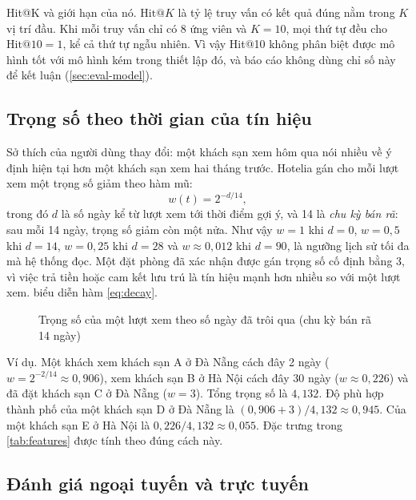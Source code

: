 Hit@K và giới hạn của nó. $\text{Hit@}K$ là tỷ lệ truy vấn có kết quả đúng nằm trong $K$ vị trí đầu. Khi mỗi truy vấn chỉ có 8 ứng viên và $K = 10$, mọi thứ tự đều cho $\text{Hit@10} = 1$, kể cả thứ tự ngẫu nhiên. Vì vậy Hit@10 không phân biệt được mô hình tốt với mô hình kém trong thiết lập đó, và báo cáo không dùng chỉ số này để kết luận (\cref{sec:eval-model}).

\subsection{Trọng số theo thời gian của tín hiệu}\label{sec:decay}

Sở thích của người dùng thay đổi: một khách sạn xem hôm qua nói nhiều về ý định hiện tại hơn một khách sạn xem hai tháng trước. Hotelia gán cho mỗi lượt xem một trọng số giảm theo hàm mũ:
\begin{equation}
  w(t) = 2^{-d/14},
  \label{eq:decay}
\end{equation}
trong đó $d$ là số ngày kể từ lượt xem tới thời điểm gợi ý, và 14 là \emph{chu kỳ bán rã}: sau mỗi 14 ngày, trọng số giảm còn một nửa. Như vậy $w = 1$ khi $d = 0$, $w = 0{,}5$ khi $d = 14$, $w = 0{,}25$ khi $d = 28$ và $w \approx 0{,}012$ khi $d = 90$, là ngưỡng lịch sử tối đa mà hệ thống đọc. Một đặt phòng đã xác nhận được gán trọng số cố định bằng 3, vì việc trả tiền hoặc cam kết lưu trú là tín hiệu mạnh hơn nhiều so với một lượt xem.  biểu diễn hàm \cref{eq:decay}.

\begin{figure}[H]
\centering
{}
\caption{Trọng số của một lượt xem theo số ngày đã trôi qua (chu kỳ bán rã 14 ngày)}\label{fig:decay}
\end{figure}

Ví dụ. Một khách xem khách sạn A ở Đà Nẵng cách đây 2 ngày ($w = 2^{-2/14} \approx 0{,}906$), xem khách sạn B ở Hà Nội cách đây 30 ngày ($w \approx 0{,}226$) và đã đặt khách sạn C ở Đà Nẵng ($w = 3$). Tổng trọng số là $4{,}132$. Độ phù hợp thành phố của một khách sạn D ở Đà Nẵng là $(0{,}906 + 3)/4{,}132 \approx 0{,}945$. Của một khách sạn E ở Hà Nội là $0{,}226/4{,}132 \approx 0{,}055$. Đặc trưng  trong \cref{tab:features} được tính theo đúng cách này.

\subsection{Đánh giá ngoại tuyến và trực tuyến}

